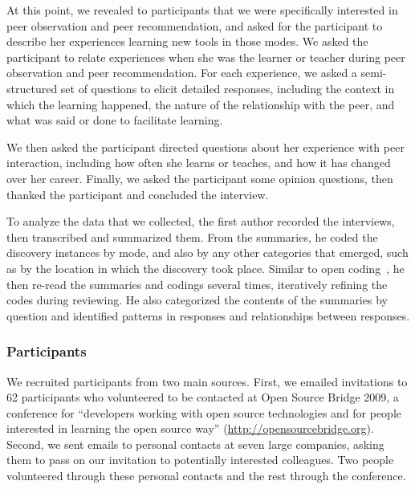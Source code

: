 \documentclass[smallextended]{svjour3}
\newcommand\discovery{peer interaction\xspace}
\newcommand\discpush{peer recommendation\xspace}
\newcommand\discpull{peer observation\xspace}
\newcommand\contexts{modes\xspace}
\begin{document}
At this point, we revealed to participants that we were specifically interested in
\discpull and \discpush, and asked for the participant to describe her experiences learning
new tools in those \contexts.
We asked the participant to relate experiences when she was the learner or teacher
during \discpull and \discpush. 
For each experience, we asked a semi-structured set of questions to elicit
detailed responses, including the context in which the learning
happened, the nature of the relationship with the peer, and what was said or
done to facilitate learning.

We then asked the participant directed questions about her experience
with \discovery, including how often she learns or teaches, and how it
has changed over her career. 
Finally, we asked the participant some opinion questions, then thanked the
participant and concluded the interview.

To analyze the data that we collected, the first author recorded the interviews, 
then transcribed and summarized them.
From the summaries, he coded the discovery instances by mode, and also by any
other categories that emerged, such as by the location in which the discovery
took place.
Similar to open coding~\cite{glaser2009discovery}, he then re-read the summaries and codings several times, 
iteratively refining the codes during reviewing.
He also categorized the contents of the summaries by question and identified
patterns in responses and relationships between responses.

\subsubsection{Participants}

\noindent
We recruited participants from two main sources.
First, we emailed invitations to 62 participants who volunteered to be
contacted at Open Source Bridge 2009, a
conference for ``developers working with open source technologies and 
for people interested in learning the open source way''
(\url{http://opensourcebridge.org}). 
Second, we sent emails to personal contacts at seven large companies, asking
them to pass on our invitation to potentially interested colleagues.
Two people volunteered through these personal contacts and the
rest through the conference.
\end{document}

